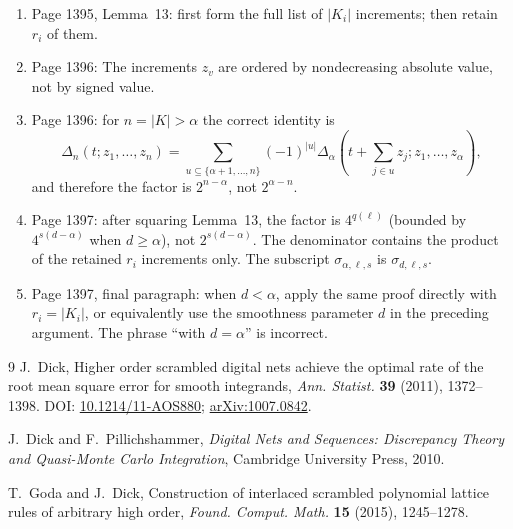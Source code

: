 \documentclass[11pt]{article}
\newcommand{\abs}[1]{\lvert #1\rvert}
\begin{document}
\begin{enumerate}[leftmargin=2.5em]
\item Page 1395, Lemma~13: first form the full list of $\abs{K_i}$ increments;
      then retain $r_i$ of them.  
\item Page 1396: The increments $z_{v}$ are ordered by nondecreasing
      absolute value, not by signed value.
\item Page 1396: for $n=\abs K>\alpha$ the correct identity is
\[
 \Delta_n(t;z_1,\ldots,z_n)
 =\sum_{u\subseteq\{\alpha+1,\ldots,n\}}
   (-1)^{\abs u}
   \Delta_\alpha\!\left(t+\sum_{j\in u}z_j;z_1,\ldots,z_\alpha\right),
\]
      and therefore the factor is $2^{n-\alpha}$, not $2^{\alpha-n}$.
\item Page 1397: after squaring Lemma~13, the factor is
      $4^{q(\boldsymbol\ell)}$ (bounded by $4^{s(d-\alpha)}$ when
      $d\ge\alpha$), not $2^{s(d-\alpha)}$.  The denominator contains the
      product of the retained $r_i$ increments only.  The subscript
      $\sigma_{\alpha,\boldsymbol\ell,s}$ is
      $\sigma_{d,\boldsymbol\ell,s}$.
\item Page 1397, final paragraph: when $d<\alpha$, apply the same proof directly
      with $r_i=\abs{K_i}$, or equivalently use the smoothness parameter $d$ in
      the preceding argument.  The phrase ``with $d=\alpha$'' is incorrect.
\end{enumerate}


\begin{thebibliography}{9}
J.~Dick,
\newblock Higher order scrambled digital nets achieve the optimal rate of the
root mean square error for smooth integrands,
\newblock \emph{Ann. Statist.} \textbf{39} (2011), 1372--1398.
\newblock DOI: \href{https://doi.org/10.1214/11-AOS880}{10.1214/11-AOS880};
\href{https://arxiv.org/abs/1007.0842}{arXiv:1007.0842}.

J.~Dick and F.~Pillichshammer,
\newblock \emph{Digital Nets and Sequences: Discrepancy Theory and
Quasi-Monte Carlo Integration},
\newblock Cambridge University Press, 2010.

T.~Goda and J.~Dick,
\newblock Construction of interlaced scrambled polynomial lattice rules of
arbitrary high order,
\newblock \emph{Found. Comput. Math.} \textbf{15} (2015), 1245--1278.
\end{thebibliography}
\end{document}
